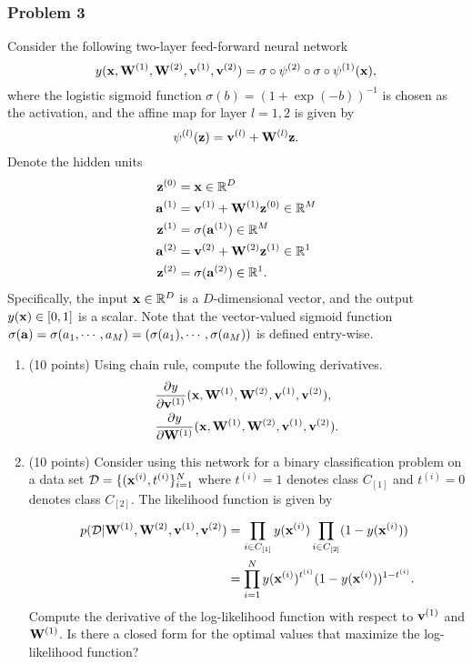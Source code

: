 \documentclass[12pt,a4paper]{article}
\renewcommand{\v}[1]{\ifmmode\mathbf{#1}\fi}
\newcommand{\PROD}[2]{\prod\limits_{#1}^{#2}}
\renewcommand{\o}{\circ}
\def\R{\ifmmode\mathbb R\fi}
\begin{document}
\subsubsection*{Problem 3}
Consider the following two-layer feed-forward neural network
\begin{equation*}
y(\v x, \v W^{(1)}, \v W^{(2)}, \v v^{(1)}, \v v^{(2)}) = \sigma \o \psi^{(2)} \o \sigma \o \psi^{(1)}  (\v x),
\end{equation*}
where the logistic sigmoid function $\sigma(b) = (1+\exp(-b))^{-1}$ is chosen as the activation, and the affine map for layer $l = 1, 2$ is given by
\begin{equation*}
	\psi^{(l)}(\v z) = \v v^{(l)} + \v W^{(l)} \v z.
\end{equation*}
Denote the hidden units 
\begin{align*}
	\mathbf z^{(0)} &= \v x \in \R^{D} \\
	\mathbf a^{(1)} &= \v v^{(1)} + \v W^{(1)} \v z^{(0)} \in \R^{M} \\
	\mathbf z^{(1)} &= \sigma(\v a^{(1)}) \in \R^{M} \\
	\mathbf a^{(2)} &= \v v^{(2)} + \v W^{(2)} \v z^{(1)} \in \R^1 \\
	\mathbf z^{(2)} &= \sigma(\v a^{(2)}) \in \R^1.
\end{align*}
Specifically, the input $\v x\in\R^D$ is a $D$-dimensional vector, and the output $y(\v x) \in [0, 1]$ is a scalar. Note that the vector-valued sigmoid function $\sigma(\v a) = \sigma(a_1, \cdots, a_M) = (\sigma(a_1), \cdots, \sigma(a_M))$ is defined entry-wise. 
\begin{enumerate}[label=(\alph*)]
	\item (10 points)
	Using chain rule, compute the following derivatives.
	\begin{equation*}
	\begin{split}
		&\frac{\partial y}{\partial \v v^{(1)}}(\v x, \v W^{(1)}, \v W^{(2)}, \v v^{(1)}, \v v^{(2)}), \\
		&\frac{\partial y}{\partial \v W^{(1)}}(\v x, \v W^{(1)}, \v W^{(2)}, \v v^{(1)}, \v v^{(2)}).
	\end{split}
	\end{equation*}
	\item (10 points)
	Consider using this network for a binary classification problem on a data set $\mathcal D = \{(\v x^{(i)}, t^{(i)}\}_{i=1}^N$ where $t^{(i)} = 1$ denotes class $C_{[1]}$ and $t^{(i)} = 0$ denotes class $C_{[2]}$. The likelihood function is given by
	\begin{align*}
		p(\mathcal D\vert \v W^{(1)}, \v W^{(2)}, \v v^{(1)}, \v v^{(2)}) 
		&= \PROD{i\in C_{[1]}}{} y(\v x^{(i)}) \PROD{i\in C_{[2]}}{} (1-y(\v x^{(i)})) \\
		&= \PROD{i=1}N y(\v x^{(i)})^{t^{(i)}} (1-y(\v x^{(i)}))^{1-t^{(i)}}.
	\end{align*}
	Compute the derivative of the log-likelihood function with respect to $\v v^{(1)}$ and $\v W^{(1)}$. Is there a closed form for the optimal values that maximize the log-likelihood function?
\end{enumerate}
\end{document}
